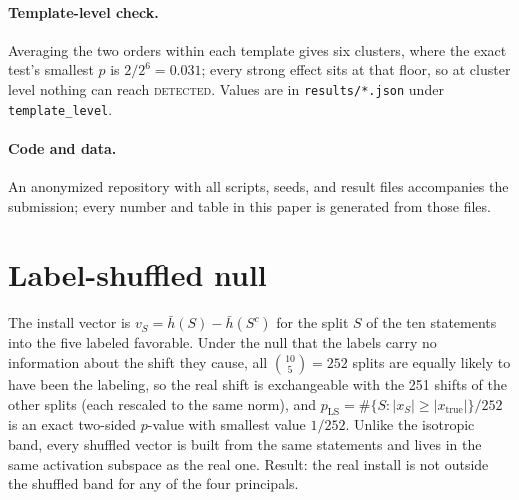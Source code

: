 \documentclass{article}
\begin{document}
\paragraph{Template-level check.} Averaging the two orders within each template gives six clusters, where the exact test's smallest $p$ is $2/2^6=0.031$;
every strong effect sits at that floor, so at cluster level nothing can reach \textsc{detected}. Values are in \texttt{results/*.json} under
\texttt{template\_level}.
\paragraph{Code and data.} An anonymized repository with all scripts, seeds, and result files accompanies the submission; every number and table in this
paper is generated from those files.

\section{Label-shuffled null}
\label{app:ls}
The install vector is $v_S=\bar h(S)-\bar h(S^c)$ for the split $S$ of the ten statements into the five labeled favorable. Under the null that the labels
carry no information about the shift they cause, all $\binom{10}{5}=252$ splits are equally likely to have been the labeling, so the real shift is
exchangeable with the 251 shifts of the other splits (each rescaled to the same norm), and $p_{\mathrm{LS}}=\#\{S:|x_S|\ge|x_{\text{true}}|\}/252$ is an
exact two-sided $p$-value with smallest value $1/252$. Unlike the isotropic band, every shuffled vector is built from the same statements and lives in the
same activation subspace as the real one. Result: the real install is not outside the shuffled band for any of the four principals.
\end{document}
